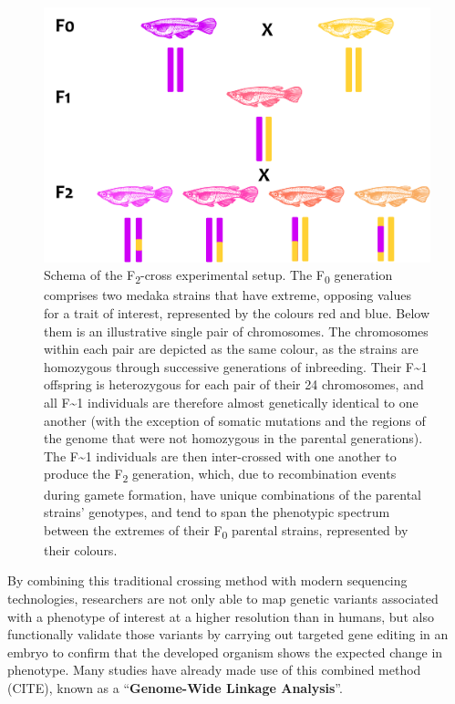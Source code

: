\documentclass[
]{book}
\begin{document}
\begin{figure}
\includegraphics[width=1\linewidth]{figs/mikk_behaviour/F2-cross-schema} \caption{Schema of the F\textsubscript{2}-cross experimental setup. The F\textsubscript{0} generation comprises two medaka strains that have extreme, opposing values for a trait of interest, represented by the colours red and blue. Below them is an illustrative single pair of chromosomes. The chromosomes within each pair are depicted as the same colour, as the strains are homozygous through successive generations of inbreeding. Their F\textasciitilde1 offspring is heterozygous for each pair of their 24 chromosomes, and all F\textasciitilde1 individuals are therefore almost genetically identical to one another (with the exception of somatic mutations and the regions of the genome that were not homozygous in the parental generations). The F\textasciitilde1 individuals are then inter-crossed with one another to produce the F\textsubscript{2} generation, which, due to recombination events during gamete formation, have unique combinations of the parental strains' genotypes, and tend to span the phenotypic spectrum between the extremes of their F\textsubscript{0} parental strains, represented by their colours.}\label{fig:F2-cross-schema}
\end{figure}

By combining this traditional crossing method with modern sequencing technologies, researchers are not only able to map genetic variants associated with a phenotype of interest at a higher resolution than in humans, but also functionally validate those variants by carrying out targeted gene editing in an embryo to confirm that the developed organism shows the expected change in phenotype. Many studies have already made use of this combined method (CITE), known as a ``\textbf{Genome-Wide Linkage Analysis}''.
\end{document}

